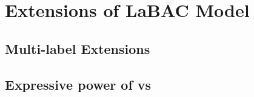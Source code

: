\section{Extensions of LaBAC Model}




\subsection{Multi-label Extensions}


\subsection{Expressive power of  \labacZeroOneOne vs \labacZeroMN}

